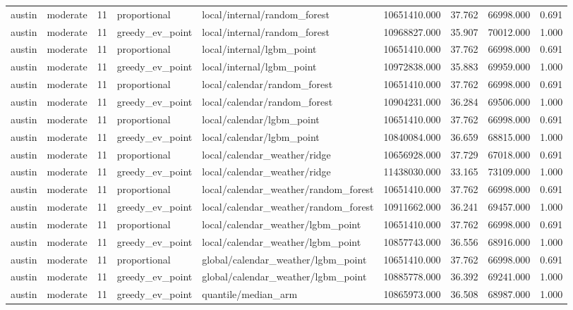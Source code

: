 \begin{tabular}{llrllrrrr}
austin & moderate & 11 & proportional & local/internal/random\_forest & 10651410.000 & 37.762 & 66998.000 & 0.691 \\
austin & moderate & 11 & greedy\_ev\_point & local/internal/random\_forest & 10968827.000 & 35.907 & 70012.000 & 1.000 \\
austin & moderate & 11 & proportional & local/internal/lgbm\_point & 10651410.000 & 37.762 & 66998.000 & 0.691 \\
austin & moderate & 11 & greedy\_ev\_point & local/internal/lgbm\_point & 10972838.000 & 35.883 & 69959.000 & 1.000 \\
austin & moderate & 11 & proportional & local/calendar/random\_forest & 10651410.000 & 37.762 & 66998.000 & 0.691 \\
austin & moderate & 11 & greedy\_ev\_point & local/calendar/random\_forest & 10904231.000 & 36.284 & 69506.000 & 1.000 \\
austin & moderate & 11 & proportional & local/calendar/lgbm\_point & 10651410.000 & 37.762 & 66998.000 & 0.691 \\
austin & moderate & 11 & greedy\_ev\_point & local/calendar/lgbm\_point & 10840084.000 & 36.659 & 68815.000 & 1.000 \\
austin & moderate & 11 & proportional & local/calendar\_weather/ridge & 10656928.000 & 37.729 & 67018.000 & 0.691 \\
austin & moderate & 11 & greedy\_ev\_point & local/calendar\_weather/ridge & 11438030.000 & 33.165 & 73109.000 & 1.000 \\
austin & moderate & 11 & proportional & local/calendar\_weather/random\_forest & 10651410.000 & 37.762 & 66998.000 & 0.691 \\
austin & moderate & 11 & greedy\_ev\_point & local/calendar\_weather/random\_forest & 10911662.000 & 36.241 & 69457.000 & 1.000 \\
austin & moderate & 11 & proportional & local/calendar\_weather/lgbm\_point & 10651410.000 & 37.762 & 66998.000 & 0.691 \\
austin & moderate & 11 & greedy\_ev\_point & local/calendar\_weather/lgbm\_point & 10857743.000 & 36.556 & 68916.000 & 1.000 \\
austin & moderate & 11 & proportional & global/calendar\_weather/lgbm\_point & 10651410.000 & 37.762 & 66998.000 & 0.691 \\
austin & moderate & 11 & greedy\_ev\_point & global/calendar\_weather/lgbm\_point & 10885778.000 & 36.392 & 69241.000 & 1.000 \\
austin & moderate & 11 & greedy\_ev\_point & quantile/median\_arm & 10865973.000 & 36.508 & 68987.000 & 1.000 \\

\end{tabular}
